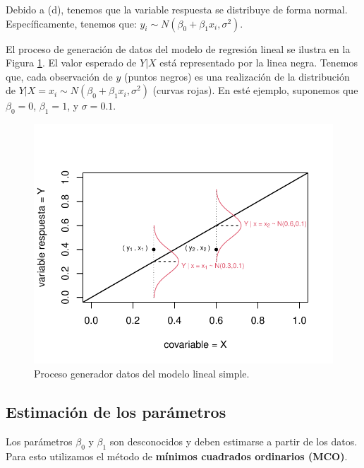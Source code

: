 \documentclass[
]{article}
\begin{document}
Debido a (d), tenemos que la variable respuesta se distribuye de forma normal. Específicamente, tenemos que: \(y_{i} \sim N(\beta_{0} + \beta_{1}x_i, \sigma^{2})\).

El proceso de generación de datos del modelo de regresión lineal se ilustra en la Figura \ref{fig:gendataFigure}. El valor esperado de \(Y|X\) está representado por la linea negra. Tenemos que, cada observación de \(y\) (puntos negros) es una realización de la distribución de \(Y|X=x_{i} \sim N(\beta_{0}+\beta_{1}x_{i},\sigma^{2})\) (curvas rojas). En esté ejemplo, suponemos que \(\beta_{0}=0\), \(\beta_{1}=1\), y \(\sigma=0.1\).

\begin{figure}

{\centering \includegraphics{MLGI_files/figure-latex/gendataFigure-1} 

}

\caption{Proceso generador datos del modelo lineal simple.}\label{fig:gendataFigure}
\end{figure}

\hypertarget{estimaciuxf3n-de-los-paruxe1metros}{%
\subsection{Estimación de los parámetros}\label{estimaciuxf3n-de-los-paruxe1metros}}

Los parámetros \(\beta_{0}\) y \(\beta_{1}\) son desconocidos y deben estimarse a partir de los datos. Para esto utilizamos el método de \textbf{mínimos cuadrados ordinarios (MCO)}.
\end{document}
